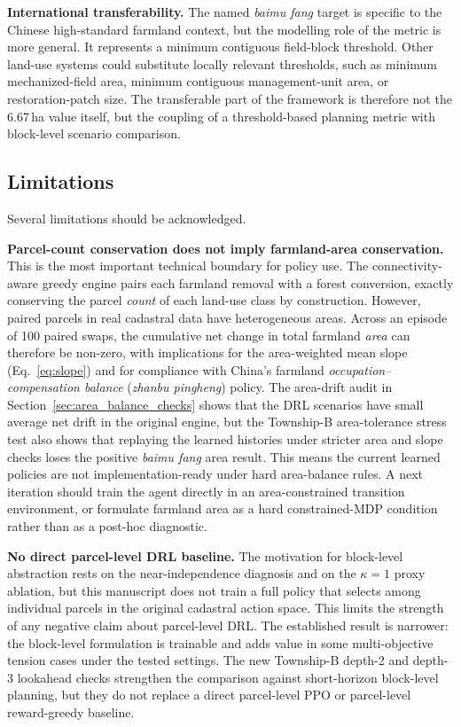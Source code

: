 \documentclass[preprint,12pt]{elsarticle}
\begin{document}
\textbf{International transferability.} The named \textit{baimu fang} target is specific to the Chinese high-standard farmland context, but the modelling role of the metric is more general. It represents a minimum contiguous field-block threshold. Other land-use systems could substitute locally relevant thresholds, such as minimum mechanized-field area, minimum contiguous management-unit area, or restoration-patch size. The transferable part of the framework is therefore not the 6.67\,ha value itself, but the coupling of a threshold-based planning metric with block-level scenario comparison.

\subsection{Limitations}
\label{sec:limitations}

Several limitations should be acknowledged.

\textbf{Parcel-count conservation does not imply farmland-area conservation.} This is the most important technical boundary for policy use. The connectivity-aware greedy engine pairs each farmland removal with a forest conversion, exactly conserving the parcel \textit{count} of each land-use class by construction. However, paired parcels in real cadastral data have heterogeneous areas. Across an episode of 100 paired swaps, the cumulative net change in total farmland \textit{area} can therefore be non-zero, with implications for the area-weighted mean slope (Eq.~\ref{eq:slope}) and for compliance with China's farmland \textit{occupation--compensation balance} (\textit{zhanbu pingheng}) policy. The area-drift audit in Section~\ref{sec:area_balance_checks} shows that the DRL scenarios have small average net drift in the original engine, but the Township-B area-tolerance stress test also shows that replaying the learned histories under stricter area and slope checks loses the positive \textit{baimu fang} area result. This means the current learned policies are not implementation-ready under hard area-balance rules. A next iteration should train the agent directly in an area-constrained transition environment, or formulate farmland area as a hard constrained-MDP condition rather than as a post-hoc diagnostic.

\textbf{No direct parcel-level DRL baseline.} The motivation for block-level abstraction rests on the near-independence diagnosis and on the $\kappa=1$ proxy ablation, but this manuscript does not train a full policy that selects among individual parcels in the original cadastral action space. This limits the strength of any negative claim about parcel-level DRL. The established result is narrower: the block-level formulation is trainable and adds value in some multi-objective tension cases under the tested settings. The new Township-B depth-2 and depth-3 lookahead checks strengthen the comparison against short-horizon block-level planning, but they do not replace a direct parcel-level PPO or parcel-level reward-greedy baseline.
\end{document}
